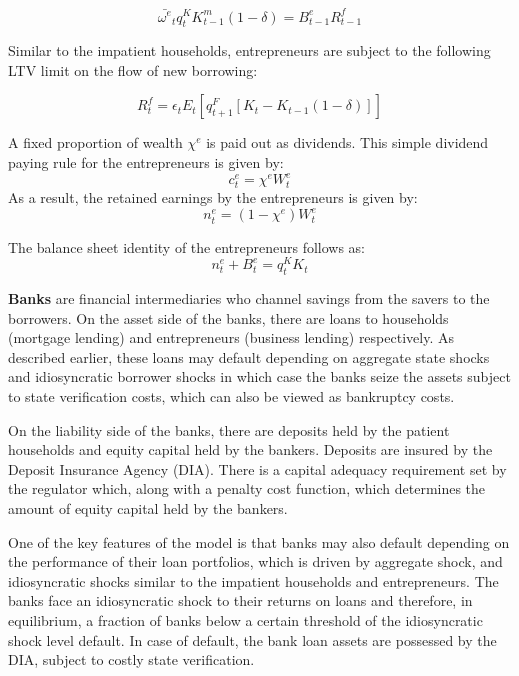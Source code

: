 \documentclass[12pt]{article}
\numberwithin{equation}{section}
\begin{document}
\begin{equation}
\bar{\omega^e}_t q^K_{t} K^m_{t-1}(1-\delta) = B^e_{t-1}R^f_{t-1}
\end{equation}

Similar to the impatient households, entrepreneurs are subject to the following LTV limit on the flow of new borrowing: 

\begin{equation}
[B^e_t-B^e_{t-1}(1-rp)]R^f_{t} =\epsilon_{t} E_t[q^F_{t+1} [K_t-K_{t-1}(1-\delta)]]
\end{equation}


A fixed proportion of wealth $\chi^e$ is paid out as dividends. This simple dividend paying rule for the entrepreneurs is given by:
\begin{equation}
c^e_t=\chi^e W^e_t
\end{equation}
As a result, the retained earnings by the entrepreneurs is given by:
\begin{equation}
n^e_t=(1-\chi^e) W^e_t
\end{equation}

The balance sheet identity of the entrepreneurs follows as:
\begin{equation}
n^e_t+B^e_t=q^K_t K_t
\end{equation}

\noindent
\textbf{Banks } are financial intermediaries who channel savings from the savers to the borrowers. On the asset side of the banks, there are loans to households (mortgage lending) and entrepreneurs (business lending) respectively. As described earlier, these loans may default depending on aggregate state shocks and idiosyncratic borrower shocks in which case the banks seize the assets subject to state verification costs, which can also be viewed as bankruptcy costs. 


On the liability side of the banks, there are deposits held by the patient households and equity capital held by the bankers. Deposits are insured by the Deposit Insurance Agency (DIA). There is a capital adequacy requirement set by the regulator which, along with a penalty cost function, which determines the amount of equity capital held by the bankers.

One of the key features of the model  is that banks may also default depending on the performance of their loan portfolios, which is driven by aggregate shock, and idiosyncratic shocks similar to the impatient households and entrepreneurs.
 The banks face an idiosyncratic shock to their returns on loans and therefore, in equilibrium, a fraction of banks below a certain threshold of the idiosyncratic shock level default. In case of default, the bank loan assets are possessed by the DIA, subject to costly state verification. 
\end{document}

